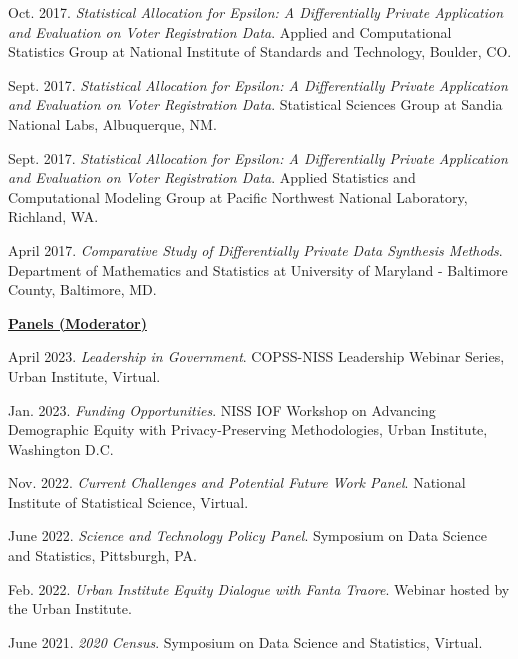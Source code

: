 \begin{etaremune}[topsep=0pt, itemsep=5pt, partopsep=0pt, parsep=0pt]
    \item Oct. 2017. \textit{Statistical Allocation for Epsilon: A Differentially Private Application and Evaluation on Voter Registration Data}. Applied and Computational Statistics Group at National Institute of Standards and Technology, Boulder, CO.
    
    \item Sept. 2017. \textit{Statistical Allocation for Epsilon: A Differentially Private Application and Evaluation on Voter Registration Data}. Statistical Sciences Group at Sandia National Labs, Albuquerque, NM.
    
    \item Sept. 2017. \textit{Statistical Allocation for Epsilon: A Differentially Private Application and Evaluation on Voter Registration Data}. Applied Statistics and Computational Modeling Group at Pacific Northwest National Laboratory, Richland, WA.
    
    \item April 2017. \textit{Comparative Study of Differentially Private Data Synthesis Methods}. Department of Mathematics and Statistics at University of Maryland - Baltimore County, Baltimore, MD.
    
\vspace{6pt}
\hspace{-0.30in}\underline{\textbf{\large Panels (Moderator)}}\normalsize
    \item April 2023. \textit{Leadership in Government}. COPSS-NISS Leadership Webinar Series, Urban Institute, Virtual.
    
    \item Jan. 2023. \textit{Funding Opportunities}. NISS IOF Workshop on Advancing Demographic Equity with Privacy-Preserving Methodologies, Urban Institute, Washington D.C.
    
    \item Nov. 2022. \textit{Current Challenges and Potential Future Work Panel}. National Institute of Statistical Science, Virtual.
    
    \item June 2022. \textit{Science and Technology Policy Panel}. Symposium on Data Science and Statistics, Pittsburgh, PA.
    
    \item Feb. 2022. \textit{Urban Institute Equity Dialogue with Fanta Traore}. Webinar hosted by the Urban Institute.
    
    \item June 2021. \textit{2020 Census}. Symposium on Data Science and Statistics, Virtual.
    

\end{etaremune}
